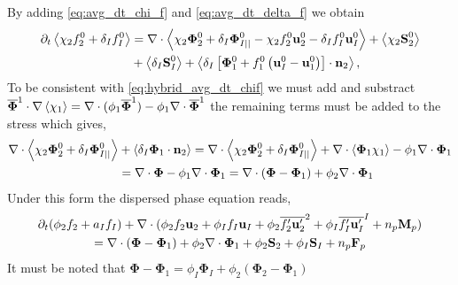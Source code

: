 By adding \ref{eq:avg_dt_chi_f} and \ref{eq:avg_dt_delta_f} we obtain 
\begin{align*}
    \partial_t \left<\chi_2 f_2^0 +\delta_If_I^0\right>
    &= \mathbf{\nabla} \cdot \left<\chi_2 \mathbf{\Phi}_2^0 + \delta_I \mathbf{\Phi}_{I||}^0 - \chi_2 f_2^0 \textbf{u}_2^0 - \delta_I f_I^0 \textbf{u}_I^0\right>
    + \left<\chi_2 \textbf{S}_2^0 \right>\\
    &+ \left<\delta_I\textbf{S}_I^0\right> 
    + \left<\delta_I\left[
        \mathbf{\Phi}_1^0
        + f_1^0
        \left(
            \textbf{u}_I^0
            - \textbf{u}_1^0
        \right)
    \right]
    \cdot \textbf{n}_2\right>,
\end{align*}
To be consistent with \ref{eq:hybrid_avg_dt_chif} we must add and substract $\overline{\mathbf{\Phi}}^1\cdot\mathbf{\nabla} \left<\chi_1\right> = \mathbf{\nabla} \cdot  (\phi_1 \overline{\mathbf{\Phi}}^1) - \phi_1 \mathbf{\nabla} \cdot \overline{\mathbf{\Phi}}^1$ the remaining terms must be added to the stress which gives,
\begin{align*}
    \mathbf{\nabla} \cdot \left<\chi_2 \mathbf{\Phi}_2^0 + \delta_I \mathbf{\Phi}_{I||}^0\right>
    & + \left<\delta_I \bm{\Phi}_1 \cdot \textbf{n}_2\right>
    =
    \mathbf{\nabla} \cdot \left<\chi_2 \mathbf{\Phi}_2^0 + \delta_I \mathbf{\Phi}_{I||}^0\right>
    + \mathbf{\nabla} \cdot \left<\bm{\Phi}_1 \chi_1\right> 
     - \phi_1 \mathbf{\nabla} \cdot \bm{\Phi}_1\\
    &= \mathbf{\nabla} \cdot \bm{\Phi}
     - \phi_1 \mathbf{\nabla} \cdot \bm{\Phi}_1
     =  \mathbf{\nabla} \cdot (\bm{\Phi} - \bm{\Phi}_1)
     + \phi_2 \mathbf{\nabla} \cdot \bm{\Phi}_1\\
\end{align*}
Under this form the dispersed phase equation reads, 
\begin{multline*}
    \partial_t (\phi_2 f_2 +a_If_I)
    + \mathbf{\nabla} \cdot (
        \phi_2 f_2 \textbf{u}_2
        + \phi_I f_I \textbf{u}_I
        + \phi_2 \overline{f_2'\textbf{u}_2'}^2 
        + \phi_I \overline{f_I'\textbf{u}_I'}^I
        + n_p \textbf{M}_p 
        )\\
    = 
    \mathbf{\nabla} \cdot (\mathbf{\Phi}  - \mathbf{\Phi}_1 )
    + \phi_2 \mathbf{\nabla} \cdot \mathbf{\Phi}_1 
    + \phi_2 \textbf{S}_2
    + \phi_I \textbf{S}_I
    + n_p\textbf{F}_p
\end{multline*}
It must be noted that $\mathbf{\Phi}  - \mathbf{\Phi}_1 
= \phi_I\mathbf{\Phi}_I+\phi_2(\mathbf{\Phi}_2  - \mathbf{\Phi}_1) $

